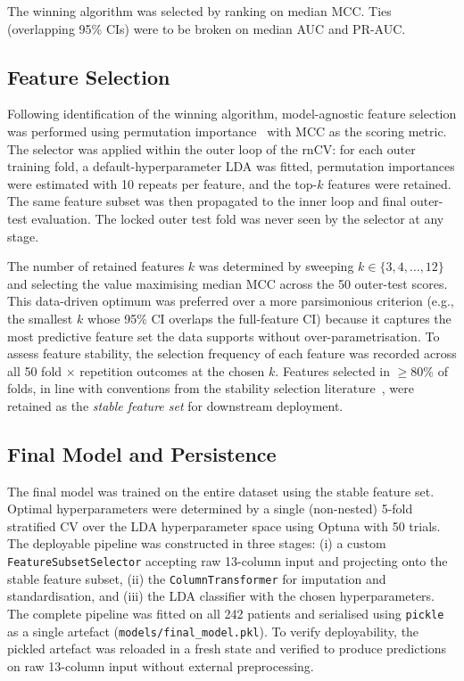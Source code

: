 The winning algorithm was selected by ranking on median MCC. Ties (overlapping 95\% CIs) were to be broken on median AUC and PR-AUC.

\subsection{Feature Selection}
\label{sec:feature_selection}

Following identification of the winning algorithm, model-agnostic feature selection was performed using permutation importance~\cite{breiman2001random,fisher2019all} with MCC as the scoring metric. The selector was applied within the outer loop of the rnCV: for each outer training fold, a default-hyperparameter LDA was fitted, permutation importances were estimated with 10 repeats per feature, and the top-$k$ features were retained. The same feature subset was then propagated to the inner loop and final outer-test evaluation. The locked outer test fold was never seen by the selector at any stage.

The number of retained features $k$ was determined by sweeping $k \in \{3, 4, \ldots, 12\}$ and selecting the value maximising median MCC across the 50 outer-test scores. This data-driven optimum was preferred over a more parsimonious criterion (e.g., the smallest $k$ whose 95\% CI overlaps the full-feature CI) because it captures the most predictive feature set the data supports without over-parametrisation. To assess feature stability, the selection frequency of each feature was recorded across all 50 fold $\times$ repetition outcomes at the chosen $k$. Features selected in $\geq 80\%$ of folds, in line with conventions from the stability selection literature~\cite{meinshausen2010stability}, were retained as the \emph{stable feature set} for downstream deployment.

\subsection{Final Model and Persistence}
\label{sec:final_model}

The final model was trained on the entire dataset using the stable feature set. Optimal hyperparameters were determined by a single (non-nested) 5-fold stratified CV over the LDA hyperparameter space using Optuna with 50 trials. The deployable pipeline was constructed in three stages: (i) a custom \texttt{FeatureSubsetSelector} accepting raw 13-column input and projecting onto the stable feature subset, (ii) the \texttt{ColumnTransformer} for imputation and standardisation, and (iii) the LDA classifier with the chosen hyperparameters. The complete pipeline was fitted on all 242 patients and serialised using \texttt{pickle} as a single artefact (\texttt{models/final\_model.pkl}). To verify deployability, the pickled artefact was reloaded in a fresh state and verified to produce predictions on raw 13-column input without external preprocessing.

